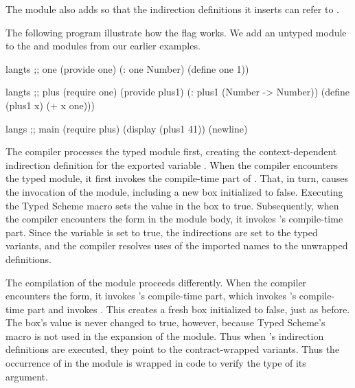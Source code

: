 \begin{schemeregion}
The  module also adds  so
that the indirection definitions it inserts can refer to
.

The following program illustrate how the flag works. We add an untyped
 module to the  and  modules
from our earlier examples.
\begin{schemedisplay}
langts ;; one
(provide one)
(: one Number)
(define one 1))

langts ;; plus
(require one)
(provide plus1)
(: plus1 (Number -> Number))
(define (plus1 x)
  (+ x one)))

langs ;; main
(require plus)
(display (plus1 41)) (newline)
\end{schemedisplay}
The compiler processes the typed  module first, creating
the context-dependent indirection definition for the exported variable
.
%
When the compiler encounters the typed  module,
it first invokes the compile-time part of . That,
in turn, causes the invocation of the  module,
including a new  box initialized to
false. Executing the Typed Scheme  macro sets
the value in the  box to true. Subsequently,
when the compiler encounters the  form in the
module body, it invokes 's compile-time part. Since the
  variable is set to true, the indirections are
set to the typed variants, and the compiler resolves uses of the
imported names to the unwrapped definitions.

The compilation of the  module proceeds differently. When
the compiler encounters the  form, it invokes
's compile-time part, which invokes
's compile-time part and invokes
. This creates a fresh  box
initialized to false, just as before. The box's value is never changed
to true, however, because Typed Scheme's  macro
is not used in the expansion of the  module. Thus when
's indirection definitions are executed, they point to
the contract-wrapped variants. Thus the occurrence of 
in the  module is wrapped in code to verify the type of
its argument.

\end{schemeregion}
